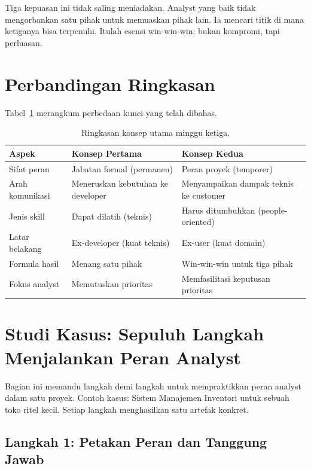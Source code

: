 \documentclass[11pt,a4paper]{article}
\begin{document}
Tiga kepuasan ini tidak saling meniadakan. Analyst yang baik tidak mengorbankan satu pihak untuk memuaskan pihak lain. Ia mencari titik di mana ketiganya bisa terpenuhi. Itulah esensi win-win-win: bukan kompromi, tapi perluasan.

\section{Perbandingan Ringkasan}

Tabel~\ref{tab:summary} merangkum perbedaan kunci yang telah dibahas.

\begin{table}[H]
	\centering
	\caption{Ringkasan konsep utama minggu ketiga.}
	\label{tab:summary}
	\footnotesize
	\begin{tabularx}{\textwidth}{l X X}
		\toprule
		Aspek           & Konsep Pertama                    & Konsep Kedua                           \\
		\midrule
		Sifat peran     & Jabatan formal (permanen)         & Peran proyek (temporer)                \\
		Arah komunikasi & Meneruskan kebutuhan ke developer & Menyampaikan dampak teknis ke customer \\
		Jenis skill     & Dapat dilatih (teknis)            & Harus ditumbuhkan (people-oriented)    \\
		Latar belakang  & Ex-developer (kuat teknis)        & Ex-user (kuat domain)                  \\
		Formula hasil   & Menang satu pihak                 & Win-win-win untuk tiga pihak           \\
		Fokus analyst   & Memutuskan prioritas              & Memfasilitasi keputusan prioritas      \\
		\bottomrule
	\end{tabularx}
\end{table}

\section{Studi Kasus: Sepuluh Langkah Menjalankan Peran Analyst}

Bagian ini memandu langkah demi langkah untuk mempraktikkan peran analyst dalam satu proyek. Contoh kasus: Sistem Manajemen Inventori untuk sebuah toko ritel kecil. Setiap langkah menghasilkan satu artefak konkret.

\subsection{Langkah 1: Petakan Peran dan Tanggung Jawab}
\end{document}
